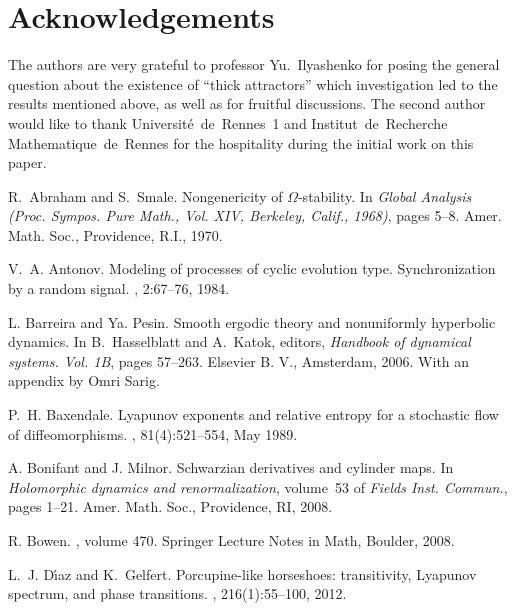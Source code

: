 \documentclass[a4paper,12pt]{amsart}
\begin{document}
\section{Acknowledgements}

The authors are very grateful to professor Yu.~Ilyashenko for posing the general question about the existence of ``thick attractors'' which investigation led to the results mentioned above, as well as for fruitful discussions.
The second author would like to thank Universit\'e~de~Rennes~1 and Institut~de~Recher\-che Mathematique~de~Rennes for the hospitality during the initial work on this paper.




\begin{thebibliography}{10}

R.~Abraham and S.~Smale.
\newblock Nongenericity of {$\Omega$}-stability.
\newblock In {\em Global {A}nalysis ({P}roc. {S}ympos. {P}ure {M}ath., {V}ol.
  {XIV}, {B}erkeley, {C}alif., 1968)}, pages 5--8. Amer. Math. Soc.,
  Providence, R.I., 1970.

V.~A. Antonov.
\newblock Modeling of processes of cyclic evolution type. {S}ynchronization by
  a random signal.
, 2:67--76, 1984.

L. Barreira and Ya. Pesin.
\newblock Smooth ergodic theory and nonuniformly hyperbolic dynamics.
\newblock In B.~Hasselblatt and A.~Katok, editors, {\em Handbook of dynamical
  systems. {V}ol. 1{B}}, pages 57--263. Elsevier B. V., Amsterdam, 2006.
\newblock With an appendix by {O}mri {S}arig.

P.~H. Baxendale.
\newblock Lyapunov exponents and relative entropy for a stochastic flow of
  diffeomorphisms.
, 81(4):521--554, May
  1989.

A. Bonifant and J. Milnor.
\newblock Schwarzian derivatives and cylinder maps.
\newblock In {\em Holomorphic dynamics and renormalization}, volume~53 of {\em
  Fields Inst. Commun.}, pages 1--21. Amer. Math. Soc., Providence, RI, 2008.


R. Bowen.
, volume 470.
\newblock Springer Lecture Notes in Math, Boulder, 2008.

L.~J. {D\'{\i}az} and K.~Gelfert.
\newblock Porcupine-like horseshoes: transitivity, {L}yapunov spectrum, and phase transitions.
, 216(1):55--100, 2012.


\end{thebibliography}
\end{document}
